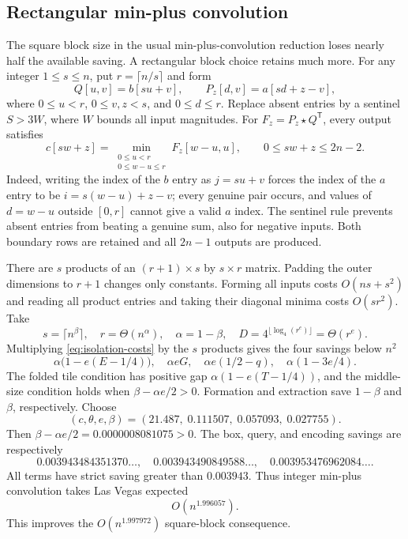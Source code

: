 \documentclass[11pt]{article}
\begin{document}
\subsection*{Rectangular min-plus convolution}
The square block size in the usual min-plus-convolution reduction loses
nearly half the available saving. A rectangular block choice retains much
more. For any integer $1\le s\le n$, put $r=\lceil n/s\rceil$ and form
\[
 Q[u,v]=b[su+v],\qquad P_z[d,v]=a[sd+z-v],
\]
where $0\le u<r$, $0\le v,z<s$, and \emph{$0\le d\le r$}. Replace
absent entries by a sentinel $S>3W$, where $W$ bounds all input
magnitudes. For $F_z=P_z\star Q^{\mathsf T}$, every output satisfies
\[
 c[sw+z]=\min_{\substack{0\le u<r\\0\le w-u\le r}}F_z[w-u,u],
 \qquad 0\le sw+z\le2n-2.
\]
Indeed, writing the index of the $b$ entry as $j=su+v$ forces the index
of the $a$ entry to be $i=s(w-u)+z-v$; every genuine pair occurs, and
values of $d=w-u$ outside $[0,r]$ cannot give a valid $a$ index. The
sentinel rule prevents absent entries from beating a genuine sum, also
for negative inputs. Both boundary rows are retained and all $2n-1$
outputs are produced.

There are $s$ products of an $(r+1)\times s$ by $s\times r$ matrix.
Padding the outer dimensions to $r+1$ changes only constants. Forming all
inputs costs $O(ns+s^2)$ and reading all product entries and taking their
diagonal minima costs $O(sr^2)$. Take
\[
 s=\lceil n^\beta\rceil,\quad r=\Theta(n^\alpha),\quad
 \alpha=1-\beta,\quad
 D=4^{\lfloor\log_4(r^e)\rfloor}=\Theta(r^e).
\]
Multiplying \eqref{eq:isolation-costs} by the $s$ products gives the four savings below $n^2$
\begin{equation}
 \alpha\bigl(1-e(E-1/4)\bigr),\quad
 \alpha eG,\quad
 \alpha e(1/2-q),\quad
 \alpha(1-3e/4).
\label{eq:rectangular-lv-savings}
\end{equation}
The folded tile condition has positive gap
$\alpha(1-e(T-1/4))$, and the middle-size condition holds when
$\beta-\alpha e/2>0$. Formation and extraction save $1-\beta$ and
$\beta$, respectively. Choose
\[
 (c,\theta,e,\beta)=(21.487,\;0.111507,\;0.057093,\;0.027755).
\]
Then $\beta-\alpha e/2=0.0000008081075>0$. The box, query, and encoding
savings are respectively
\[
 0.003943484351370\ldots,\quad
 0.003943490849588\ldots,\quad
 0.003953476962084\ldots.
\]
All terms have strict saving greater than $0.003943$. Thus integer
min-plus convolution takes Las Vegas expected
\[
 \boxed{O(n^{1.996057})}.
\]
This improves the $O(n^{1.997972})$ square-block consequence.
\end{document}
